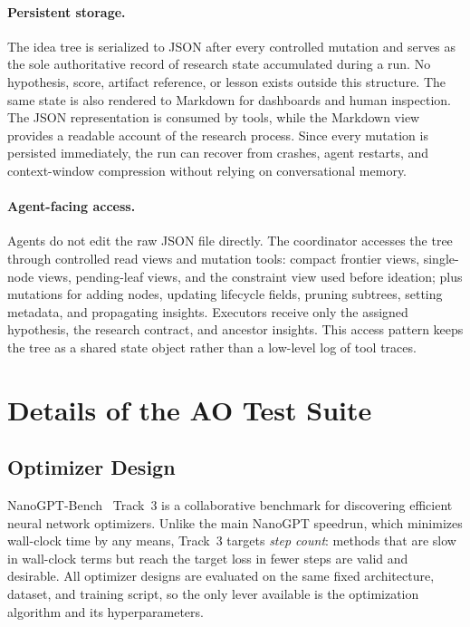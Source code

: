 \paragraph{Persistent storage.}
The idea tree is serialized to JSON after every controlled mutation and serves
as the sole authoritative record of research state accumulated during a run.
No hypothesis, score, artifact reference, or lesson exists outside this
structure. The same state is also rendered to Markdown for dashboards and human
inspection. The JSON representation is consumed by tools, while the Markdown
view provides a readable account of the research process. Since every mutation
is persisted immediately, the run can recover from crashes, agent restarts, and
context-window compression without relying on conversational memory.

\paragraph{Agent-facing access.}
Agents do not edit the raw JSON file directly. The coordinator accesses the
tree through controlled read views and mutation tools: compact frontier views,
single-node views, pending-leaf views, and the constraint view used before
ideation; plus mutations for adding nodes, updating lifecycle fields, pruning
subtrees, setting metadata, and propagating insights. Executors receive only the
assigned hypothesis, the research contract, and ancestor insights. This access
pattern keeps the tree as a shared state object rather than a low-level log of
tool traces.

\FloatBarrier

\section{Details of the AO Test Suite}
\label{app:ao-suite-details}
\label{app:benchmark-details}

\subsection{Optimizer Design}
\label{app:benchmark-optimizer-design}

NanoGPT-Bench~\citep{nanogptbench} Track~3 is a collaborative benchmark
for discovering efficient neural network optimizers.
Unlike the main NanoGPT speedrun, which minimizes wall-clock time by any
means, Track~3 targets \emph{step count}: methods that are slow in
wall-clock terms but reach the target loss in fewer steps are valid and
desirable.
All optimizer designs are evaluated on the same fixed architecture, dataset,
and training script, so the only lever available is the optimization
algorithm and its hyperparameters.

